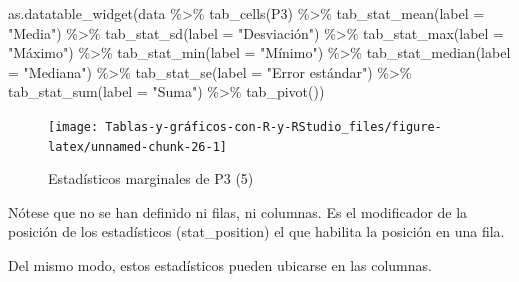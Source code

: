 \documentclass[
]{book}
\newenvironment{Shaded}{\begin{snugshade}}{\end{snugshade}}
\newcommand{\AttributeTok}[1]{\textcolor[rgb]{0.77,0.63,0.00}{#1}}
\newcommand{\FunctionTok}[1]{\textcolor[rgb]{0.00,0.00,0.00}{#1}}
\newcommand{\NormalTok}[1]{#1}
\newcommand{\SpecialCharTok}[1]{\textcolor[rgb]{0.00,0.00,0.00}{#1}}
\newcommand{\StringTok}[1]{\textcolor[rgb]{0.31,0.60,0.02}{#1}}
\begin{document}
\begin{Shaded}
\begin{Highlighting}[]
\FunctionTok{as.datatable\_widget}\NormalTok{(data }\SpecialCharTok{\%\textgreater{}\%} \FunctionTok{tab\_cells}\NormalTok{(P3) }\SpecialCharTok{\%\textgreater{}\%} \FunctionTok{tab\_stat\_mean}\NormalTok{(}\AttributeTok{label =} \StringTok{"Media"}\NormalTok{) }\SpecialCharTok{\%\textgreater{}\%} 
  \FunctionTok{tab\_stat\_sd}\NormalTok{(}\AttributeTok{label =} \StringTok{"Desviación"}\NormalTok{) }\SpecialCharTok{\%\textgreater{}\%} \FunctionTok{tab\_stat\_max}\NormalTok{(}\AttributeTok{label =} \StringTok{"Máximo"}\NormalTok{) }\SpecialCharTok{\%\textgreater{}\%} 
  \FunctionTok{tab\_stat\_min}\NormalTok{(}\AttributeTok{label =} \StringTok{"Mínimo"}\NormalTok{) }\SpecialCharTok{\%\textgreater{}\%} \FunctionTok{tab\_stat\_median}\NormalTok{(}\AttributeTok{label =} \StringTok{"Mediana"}\NormalTok{) }\SpecialCharTok{\%\textgreater{}\%} 
  \FunctionTok{tab\_stat\_se}\NormalTok{(}\AttributeTok{label =} \StringTok{"Error estándar"}\NormalTok{) }\SpecialCharTok{\%\textgreater{}\%} \FunctionTok{tab\_stat\_sum}\NormalTok{(}\AttributeTok{label =} \StringTok{"Suma"}\NormalTok{) }\SpecialCharTok{\%\textgreater{}\%} 
  \FunctionTok{tab\_pivot}\NormalTok{())}
\end{Highlighting}
\end{Shaded}

\begin{figure}[H]

{\centering \texttt{[image: Tablas-y-gráficos-con-R-y-RStudio\_files/figure-latex/unnamed-chunk-26-1]} 

}

\caption{Estadísticos marginales de P3 (5)}\label{fig:unnamed-chunk-26}
\end{figure}

Nótese que no se han definido ni filas, ni columnas. Es el modificador de la posición de los estadísticos (stat\_position) el que habilita la posición en una fila.

Del mismo modo, estos estadísticos pueden ubicarse en las columnas.
\end{document}
